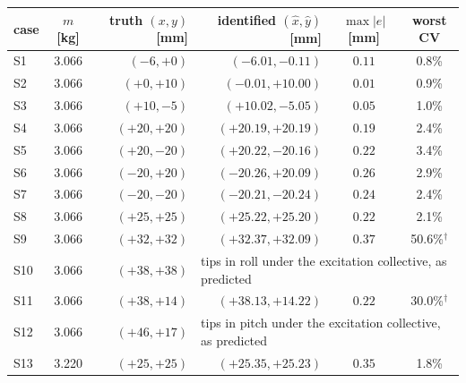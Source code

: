 \begin{tabular}{l c r r c c}
\toprule
case & $m$ [kg] & truth $(x,y)$ [mm] & identified $(\hat x,\hat y)$ [mm] & $\max|e|$ [mm] & worst CV \\
\midrule
S1 & 3.066 & $(-6,+0)$ & $(-6.01,-0.11)$ & $0.11$ & 0.8\% \\
S2 & 3.066 & $(+0,+10)$ & $(-0.01,+10.00)$ & $0.01$ & 0.9\% \\
S3 & 3.066 & $(+10,-5)$ & $(+10.02,-5.05)$ & $0.05$ & 1.0\% \\
S4 & 3.066 & $(+20,+20)$ & $(+20.19,+20.19)$ & $0.19$ & 2.4\% \\
S5 & 3.066 & $(+20,-20)$ & $(+20.22,-20.16)$ & $0.22$ & 3.4\% \\
S6 & 3.066 & $(-20,+20)$ & $(-20.26,+20.09)$ & $0.26$ & 2.9\% \\
S7 & 3.066 & $(-20,-20)$ & $(-20.21,-20.24)$ & $0.24$ & 2.4\% \\
S8 & 3.066 & $(+25,+25)$ & $(+25.22,+25.20)$ & $0.22$ & 2.1\% \\
S9 & 3.066 & $(+32,+32)$ & $(+32.37,+32.09)$ & $0.37$ & 50.6\%$^\dagger$ \\
S10 & 3.066 & $(+38,+38)$ & \multicolumn{3}{l}{tips in roll under the excitation collective, as predicted} \\
S11 & 3.066 & $(+38,+14)$ & $(+38.13,+14.22)$ & $0.22$ & 30.0\%$^\dagger$ \\
S12 & 3.066 & $(+46,+17)$ & \multicolumn{3}{l}{tips in pitch under the excitation collective, as predicted} \\
S13 & 3.220 & $(+25,+25)$ & $(+25.35,+25.23)$ & $0.35$ & 1.8\% \\
\bottomrule
\end{tabular}
